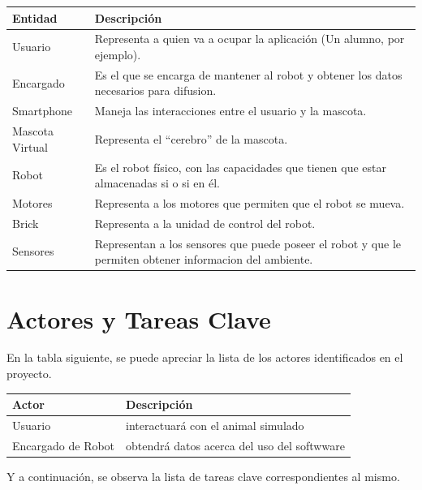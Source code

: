 \documentclass[letterpaper,12pt]{article} %
\numberwithin{equation}{section} %
\numberwithin{figure}{section} %
\numberwithin{table}{section} %
\begin{document}
\begin{table}[H]
  \centering
  \begin{tabular}{p{5cm}p{9cm}}\hline
    Entidad & Descripci\'on \\ \hline \hline %
    Usuario & Representa a quien va a ocupar la aplicaci\'on (Un alumno, por ejemplo). \\ \hline
    Encargado & Es el que se encarga de mantener al robot y obtener los datos necesarios para difusion. \\ \hline
    Smartphone & Maneja las interacciones entre el usuario y la mascota. \\ \hline
    Mascota Virtual & Representa el ``cerebro'' de la mascota. \\ \hline
    Robot & Es el robot f\'isico, con las capacidades que tienen que estar almacenadas si o si en \'el. \\ \hline
    Motores & Representa a los motores que permiten que el robot se mueva. \\ \hline
    Brick & Representa a la unidad de control del robot. \\ \hline
    Sensores & Representan a los sensores que puede poseer el robot y que le permiten obtener informacion del ambiente. \\ \hline \hline
  \end{tabular}
\end{table}

\newpage
\section{Actores y Tareas Clave}

En la tabla siguiente, se puede apreciar la lista de los actores identificados en el proyecto.\\

\begin{table}[H]
  \centering
  \begin{tabular}{p{5cm}p{9cm}}\hline
    Actor & Descripci\'on \\ \hline \hline %
    Usuario & interactuar\'a con el animal simulado \\ \hline
    Encargado de Robot & obtendr\'a datos acerca del uso del softwware \\ \hline \hline
  \end{tabular}
\end{table}

Y a continuaci\'on, se observa la lista de tareas clave correspondientes al mismo.\\
\end{document}
